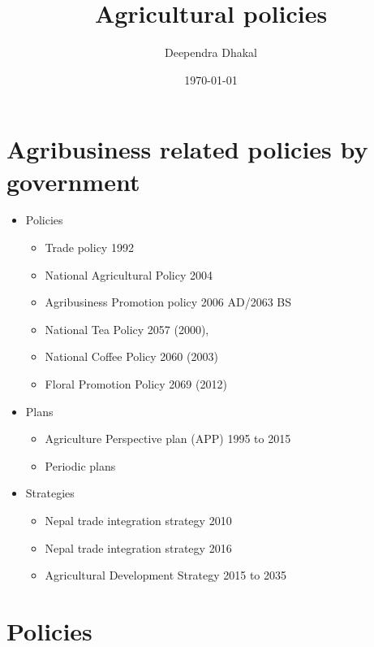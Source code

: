 \documentclass[12pt,ignorenonframetext,aspectratio=169]{beamer}
\title{\insertsectionhead}
  {
    \definecolor{white}{rgb}{0.776,0.357,0.157}
    \definecolor{iqss@orange}{rgb}{1,1,1}
    \ifnum \insertmainframenumber > \insertframenumber
    \frame{
      \frametitle{\iqsssectiontitleheader}
      \tableofcontents[currentsection]
    }
    \else
    \frame{
      \frametitle{Backup Slides}
      \tableofcontents[sectionstyle=shaded/shaded,subsectionstyle=shaded/shaded/shaded]
    }
    \fi
  }
\title[]{Agricultural policies}
\author[
        Deependra Dhakal
    ]{Deependra Dhakal}
\institute[
    ]{
    GAASC, Baitadi \and Tribhuwan University
    }
\date[
      \today
  ]{
      \today
        }
\providecommand{\tightlist}{%
  \setlength{\itemsep}{0pt}\setlength{\parskip}{0pt}}
\begin{document}
  \begin{frame}[plain]
  \titlepage
  \end{frame}



\hypertarget{agribusiness-related-policies-by-government}{%
\section{Agribusiness related policies by
government}\label{agribusiness-related-policies-by-government}}

\begin{frame}{}
\protect\hypertarget{section}{}
\begin{itemize}
\tightlist
\item
  Policies

  \begin{itemize}
  \tightlist
  \item
    Trade policy 1992
  \item
    National Agricultural Policy 2004
  \item
    Agribusiness Promotion policy 2006 AD/2063 BS
  \item
    National Tea Policy 2057 (2000),
  \item
    National Coffee Policy 2060 (2003)
  \item
    Floral Promotion Policy 2069 (2012)
  \end{itemize}
\item
  Plans

  \begin{itemize}
  \tightlist
  \item
    Agriculture Perspective plan (APP) 1995 to 2015
  \item
    Periodic plans
  \end{itemize}
\item
  Strategies

  \begin{itemize}
  \tightlist
  \item
    Nepal trade integration strategy 2010
  \item
    Nepal trade integration strategy 2016
  \item
    Agricultural Development Strategy 2015 to 2035
  \end{itemize}
\end{itemize}
\end{frame}

\hypertarget{policies}{%
\section{Policies}\label{policies}}
\end{document}
